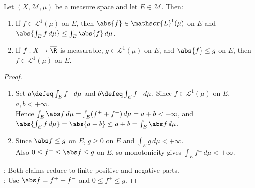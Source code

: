 \begin{theorem} \label{thm:absolute-integrability-and-domination} \\
Let $(X,\mathcal{M},\mu)$ be a measure space and let $E\in\mathcal{M}$. Then:
\begin{enumerate}[label=(\roman*)]
\setlength{\itemsep}{0pt}
\item If $f\in\mathscr{L}^1(\mu)$ on $E$, then $\abs{f}\in\mathscr{L}^1(\mu)$ on $E$ and $\abs{\int_E f\,d\mu}\leq\int_E\abs{f}\,d\mu$.
\item If $f:X\to\overline{\R}$ is measurable, $g\in\mathscr{L}^1(\mu)$ on $E$, and $\abs{f}\leq g$ on $E$, then $f\in\mathscr{L}^1(\mu)$ on $E$.
\end{enumerate}
\begin{proof}
\begin{enumerate}[label=(\roman*)]
\setlength{\itemsep}{0pt}
\item Set $a\defeq\int_Ef^+\,d\mu$ and $b\defeq\int_Ef^-\,d\mu$. Since $f\in\mathscr{L}^1(\mu)$ on $E$, $a,b<+\infty$.\\
Hence $\int_E\abs f\,d\mu=\int_E(f^++f^-)\,d\mu=a+b<+\infty$, and $\abs{\int_Ef\,d\mu}=\abs{a-b}\leq a+b=\int_E\abs f\,d\mu$.
\item Since $\abs f\leq g$ on $E$, $g\geq0$ on $E$ and $\int_Eg\,d\mu<+\infty$.\\
Also $0\leq f^\pm\leq\abs f\leq g$ on $E$, so monotonicity gives $\int_Ef^\pm\,d\mu<+\infty$.
\end{enumerate}
: Both claims reduce to finite positive and negative parts.\\
: Use $\abs f=f^++f^-$ and $0\leq f^\pm\leq g$.
\end{proof}
\end{theorem}

